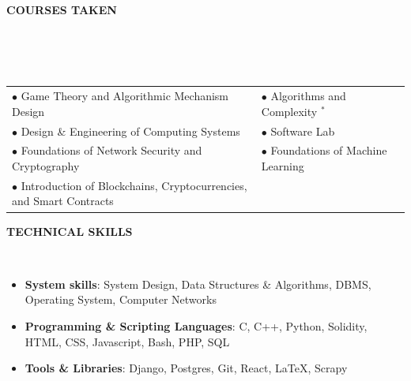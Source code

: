 \documentclass[a4paper,10pt]{article}
\newcommand{\resheading}[1]{{\small \colorbox{mygrey}{\begin{minipage}{0.99\textwidth}{\textbf{#1 \vphantom{p\^{E}}}}\end{minipage}}}}
\begin{document}
\begin{flushleft}
\resheading{\textbf{COURSES TAKEN}}
\\
\ \\
\ \\[-0.5cm]
\begin{tabular}{p{12cm}p{9cm}l}
\hspace{4.25mm} $\bullet$\hspace{0.7mm} Game Theory and Algorithmic Mechanism Design  & \qquad $\bullet$\hspace{0.7mm} Algorithms and Complexity $^*$\\

\hspace{4.25mm} $\bullet$\hspace{0.7mm} Design \& Engineering of Computing Systems & \qquad $\bullet$\hspace{0.7mm} Software Lab\\

\hspace{4.25mm} $\bullet$\hspace{0.7mm} Foundations of Network Security and Cryptography & \qquad $\bullet$\hspace{0.7mm} Foundations of Machine Learning \\

\hspace{4.25mm} $\bullet$\hspace{0.7mm} Introduction of Blockchains, Cryptocurrencies, and Smart Contracts 
\end{tabular}
\end{flushleft}
\noindent
\resheading{\textbf{TECHNICAL SKILLS}}\\
 \begin{itemize}[noitemsep,nolistsep]
  \item \textbf{System skills}: System Design, Data Structures \& Algorithms, DBMS, Operating System, Computer Networks
  \item \textbf{Programming \& Scripting Languages}: C, C++, Python, Solidity, HTML, CSS, Javascript, Bash, PHP, SQL
  \item \textbf{Tools \& Libraries}: Django, Postgres, Git, React, \LaTeX, Scrapy \\

  
  \end{itemize}
\end{document}
